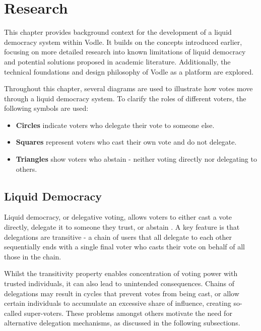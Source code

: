 \chapter{Research}
\label{ch:background}

This chapter provides background context for the development of a liquid democracy system within Vodle. It builds on the concepts introduced earlier, focusing on more detailed research into known limitations of liquid democracy and potential solutions proposed in academic literature. Additionally, the technical foundations and design philosophy of Vodle as a platform are explored.

Throughout this chapter, several diagrams are used to illustrate how votes move through a liquid democracy system. To clarify the roles of different voters, the following symbols are used:
\begin{itemize}
    \item \textbf{Circles} indicate voters who delegate their vote to someone else.
    \item \textbf{Squares} represent voters who cast their own vote and do not delegate.
    \item \textbf{Triangles} show voters who abstain - neither voting directly nor delegating to others.
\end{itemize}

\section{Liquid Democracy}

Liquid democracy, or delegative voting, allows voters to either cast a vote directly, delegate it to someone they trust, or abstain \citep{blum_liquid_2016}. A key feature is that delegations are transitive - a chain of users that all delegate to each other sequentially ends with a single final voter who casts their vote on behalf of all those in the chain.

Whilst the transitivity property enables concentration of voting power with trusted individuals, it can also lead to unintended consequences. Chains of delegations may result in cycles that prevent votes from being cast, or allow certain individuals to accumulate an excessive share of influence, creating so-called super-voters. These problems amongst others motivate the need for alternative delegation mechanisms, as discussed in the following subsections.


